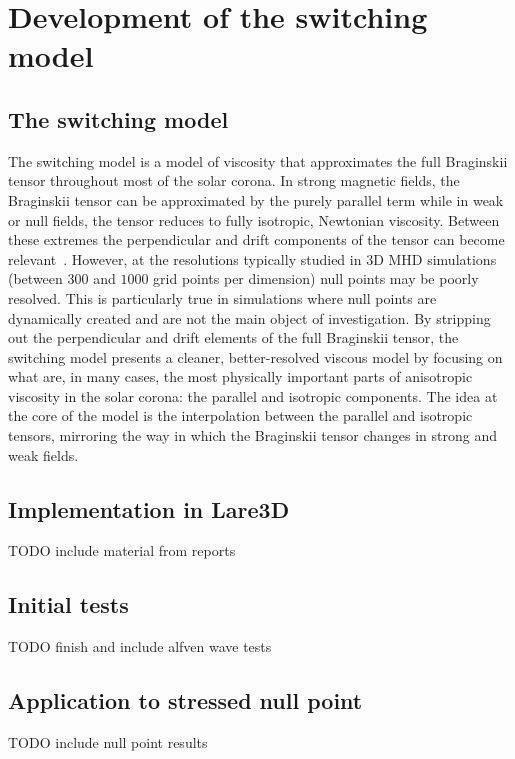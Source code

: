 \chapter{Development of the switching model}
\label{chp:switching_model}

\section{The switching model}

The switching model is a model of viscosity that approximates the full Braginskii tensor throughout most of the solar corona. In strong magnetic fields, the Braginskii tensor can be approximated by the purely parallel term while in weak or null fields, the tensor reduces to fully isotropic, Newtonian viscosity. Between these extremes the perpendicular and drift components of the tensor can become relevant~\cite{erdelyiResonantAbsorptionAlfven1995a}. However, at the resolutions typically studied in 3D MHD simulations (between $300$ and $1000$ grid points per dimension) null points may be poorly resolved. This is particularly true in simulations where null points are dynamically created and are not the main object of investigation. By stripping out the perpendicular and drift elements of the full Braginskii tensor, the switching model presents a cleaner, better-resolved viscous model by focusing on what are, in many cases, the most physically important parts of anisotropic viscosity in the solar corona: the parallel and isotropic components. The idea at the core of the model is the interpolation between the parallel and isotropic tensors, mirroring the way in which the Braginskii tensor changes in strong and weak fields.



\section{Implementation in Lare3D}

TODO include material from reports

\section{Initial tests}

TODO finish and include alfven wave tests

\section{Application to stressed null point}

TODO include null point results
